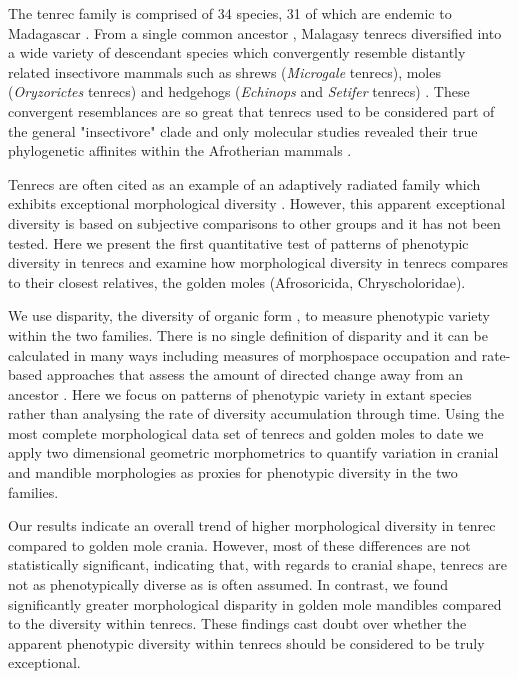 \documentclass[12pt,a4paper]{article}
\begin{document}
	The tenrec family is comprised of 34 species, 31 of which are endemic to Madagascar \citep{Olson2013}. From a single common ancestor \citep{Asher2006}, Malagasy tenrecs diversified into a wide variety of descendant species which convergently resemble distantly related insectivore mammals such as shrews (\textit{Microgale} tenrecs), moles (\textit{Oryzorictes} tenrecs) and hedgehogs (\textit{Echinops} and \textit{Setifer} tenrecs) \citep{Eisenberg1969}. These convergent resemblances are so great that tenrecs used to be considered part of the general "insectivore" clade and only molecular studies revealed their true phylogenetic affinites within the Afrotherian mammals \citep{Stanhope1998}.  

	Tenrecs are often cited as an example of an adaptively radiated family which exhibits exceptional morphological diversity \citep{Soarimalala2011, Olson2003, Eisenberg1969}. However, this apparent exceptional diversity is based on subjective comparisons to other groups and it has not been tested. Here we present the first quantitative test of patterns of phenotypic diversity in tenrecs and examine how morphological diversity in tenrecs compares to their closest relatives, the golden moles (Afrosoricida, Chryscholoridae). 

	We use disparity, the diversity of organic form \citep{Foote1997, Wills1994, Erwin2007}, to measure phenotypic variety within the two families. There is no single definition of disparity and it can be calculated in many ways including measures of morphospace occupation \citep[e.g.][]{Goswami2011, Brusatte2008} and rate-based approaches that assess the amount of directed change away from an ancestor \citep{OMeara2006, Price2013}. Here we focus on patterns of phenotypic variety in extant species rather than analysing the rate of diversity accumulation through time. 
	Using the most complete morphological data set of tenrecs and golden moles to date we apply two dimensional geometric morphometrics \citep{Rohlf1993, Adams2013} to quantify variation in cranial and mandible morphologies as proxies for phenotypic diversity in the two families. 

	Our results indicate an overall trend of higher morphological diversity in tenrec compared to golden mole crania. However, most of these differences are not statistically significant, indicating that, with regards to cranial shape, tenrecs are not as phenotypically diverse as is often assumed. In contrast, we found significantly greater morphological disparity in golden mole mandibles compared to the diversity within tenrecs.
	These findings cast doubt over whether the apparent phenotypic diversity within tenrecs should be considered to be truly exceptional. 
\end{document}
